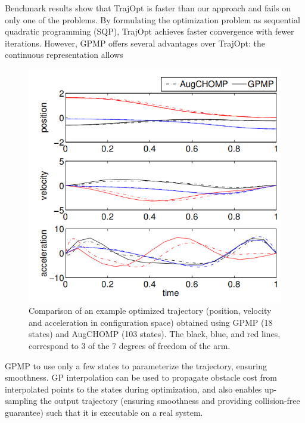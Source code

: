 \documentclass{IEEEtran}
\begin{document}
Benchmark results show that TrajOpt is faster than our
approach and fails on only one of the problems. By formulating the optimization problem as sequential quadratic
programming (SQP), TrajOpt achieves faster convergence
with fewer iterations. However, GPMP offers several advantages over TrajOpt: the continuous representation allows
\begin{figure}[htp]
\centering
\includegraphics[scale=0.4]{论文2}
\caption{Comparison of an example optimized trajectory
(position, velocity and acceleration in configuration space)
obtained using GPMP (18 states) and AugCHOMP (103
states). The black, blue, and red lines, correspond to 3 of
the 7 degrees of freedom of the arm.
}
\end{figure}
GPMP to use only a few states to parameterize the trajectory, ensuring smoothness. GP interpolation can be used to
propagate obstacle cost from interpolated points to the states
during optimization, and also enables up-sampling the output
trajectory (ensuring smoothness and providing collision-free
guarantee) such that it is executable on a real system.
\end{document}
